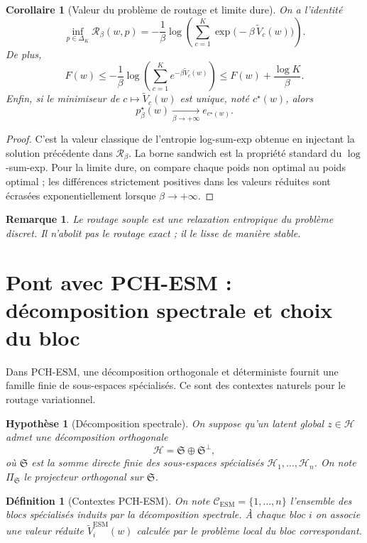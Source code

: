 \documentclass[11pt,a4paper]{article}
\newtheorem{definition}{Définition}[section]
\newtheorem{assumption}{Hypothèse}[section]
\newtheorem{corollary}{Corollaire}[section]
\newtheorem{remark}{Remarque}[section]
\newcommand{\Hh}{\mathcal H}
\newcommand{\Ccal}{\mathcal C}
\newcommand{\Rcal}{\mathcal R}
\begin{document}
\begin{corollary}[Valeur du problème de routage et limite dure]
On a l'identité
\[
\inf_{p\in\Delta_K}\Rcal_\beta(w,p)
=
-\frac{1}{\beta}\log\!\left(\sum_{c=1}^K \exp\!\bigl(-\beta\,\widetilde V_c(w)\bigr)\right).
\]
De plus,
\[
F(w)\le -\frac{1}{\beta}\log\!\left(\sum_{c=1}^K e^{-\beta \widetilde V_c(w)}\right)\le F(w)+\frac{\log K}{\beta}.
\]
Enfin, si le minimiseur de \(c\mapsto\widetilde V_c(w)\) est unique, noté \(c^\star(w)\), alors
\[
p^\star_\beta(w)\xrightarrow[\beta\to+\infty]{}e_{c^\star(w)}.
\]
\end{corollary}

\begin{proof}
C'est la valeur classique de l'entropie log-sum-exp obtenue en injectant la solution précédente dans \(\Rcal_\beta\). La borne sandwich est la propriété standard du \(\log\)-sum-exp. Pour la limite dure, on compare chaque poids non optimal au poids optimal ; les différences strictement positives dans les valeurs réduites sont écrasées exponentiellement lorsque \(\beta\to+\infty\).
\end{proof}

\begin{remark}
Le routage souple est une relaxation entropique du problème discret. Il n'abolit pas le routage exact ; il le lisse de manière stable.
\end{remark}

\section{Pont avec PCH-ESM : décomposition spectrale et choix du bloc}

Dans PCH-ESM, une décomposition orthogonale et déterministe fournit une famille finie de sous-espaces spécialisés. Ce sont des contextes naturels pour le routage variationnel.

\begin{assumption}[Décomposition spectrale]
On suppose qu'un latent global \(z\in\Hh\) admet une décomposition orthogonale
\[
\Hh=\mathfrak S\oplus\mathfrak S^\perp,
\]
où \(\mathfrak S\) est la somme directe finie des sous-espaces spécialisés \(\Hh_1,\dots,\Hh_n\). On note \(\Pi_{\mathfrak S}\) le projecteur orthogonal sur \(\mathfrak S\).
\end{assumption}

\begin{definition}[Contextes PCH-ESM]
On note \(\Ccal_{\mathrm{ESM}}=\{1,\dots,n\}\) l'ensemble des blocs spécialisés induits par la décomposition spectrale. À chaque bloc \(i\) on associe une valeur réduite \(\widetilde V_i^{\mathrm{ESM}}(w)\) calculée par le problème local du bloc correspondant.
\end{definition}
\end{document}

